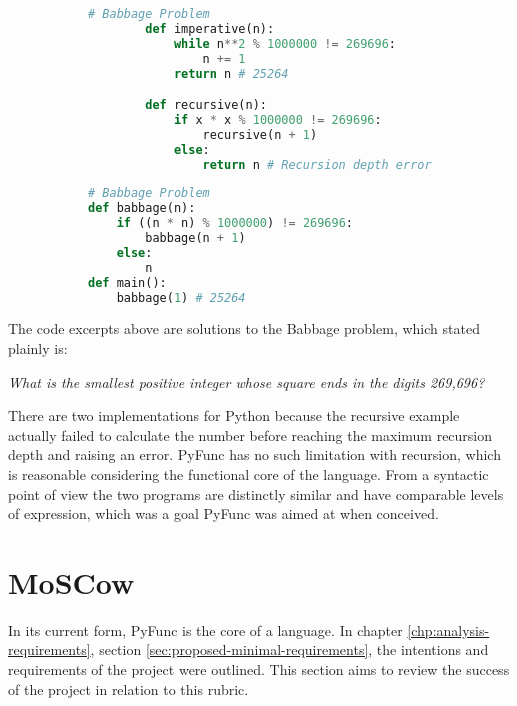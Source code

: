 \documentclass{l4proj}
\begin{document}
\begin{figure}[H]
    \begin{subfigure}{0.45\textwidth}
        \begin{lstlisting}[language=Python, label=lst:python-gcd, caption=Python solutions to the Babbage problem. ]
        # Babbage Problem
        def imperative(n):
            while n**2 % 1000000 != 269696:
                n += 1 
            return n # 25264

        def recursive(n):
            if x * x % 1000000 != 269696:
                recursive(n + 1)
            else:
                return n # Recursion depth error.
        \end{lstlisting}
    \end{subfigure}
    \hfill
    \begin{subfigure}{0.45\textwidth}
        \begin{lstlisting}[language=Python, label=lst:pyfunc-babbage, caption=Pyfunc solution to the Babbage problem.]
# Babbage Problem
def babbage(n):
    if ((n * n) % 1000000) != 269696:
        babbage(n + 1)
    else:
        n
def main():
    babbage(1) # 25264
        \end{lstlisting}
    \end{subfigure}
    \end{figure}

The code excerpts above are solutions to the Babbage problem\citep{babbage_problem}, which stated plainly is:

\begin{center}
    \emph{What is the smallest positive integer whose square ends in the digits 269,696?}
\end{center}

There are two implementations for Python because the recursive example actually failed to calculate the number before reaching the maximum recursion depth and raising an error.
PyFunc has no such limitation with recursion, which is reasonable considering the functional core of the language.
From a syntactic point of view the two programs are distinctly similar and have comparable levels of expression, which was a goal PyFunc was aimed at when conceived.

\section{MoSCow}

In its current form, PyFunc is the core of a language.
In chapter \ref{chp:analysis-requirements}, section \ref{sec:proposed-minimal-requirements}, the intentions and requirements of the project were outlined.
This section aims to review the success of the project in relation to this rubric.
\end{document}
